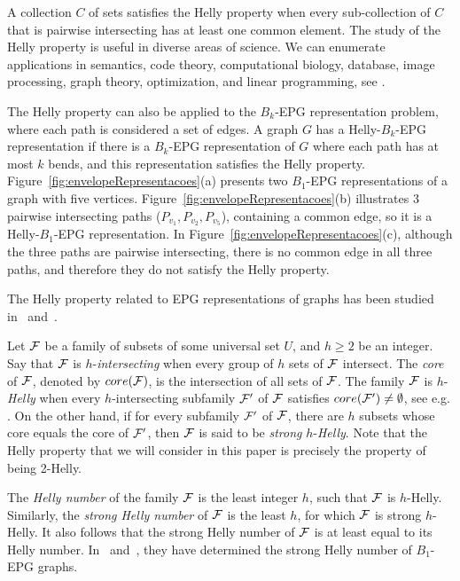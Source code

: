 A  collection $C$ of sets satisfies the Helly property when every sub-collection of $C$ that is pairwise intersecting has at least one common element. 
The study of the Helly property is useful in diverse areas of science. We can enumerate applications in semantics, code theory, computational biology, database, image processing, graph theory, optimization, and linear programming, see \cite{dourado2009}.

The Helly property can also be applied to the $B_k$-EPG representation problem, where each path is considered a set of edges. A graph $G$ has a  Helly-$B_k$-EPG representation if there is a $B_k$-EPG representation of $G$ where each path has at most $k$ bends, and this representation satisfies the Helly property. Figure~\ref{fig:envelopeRepresentacoes}(a) presents two $B_1$-EPG representations of a graph with five vertices.  Figure~\ref{fig:envelopeRepresentacoes}(b)   illustrates 3 pairwise intersecting paths ($P_{v_1}, P_{v_2}, P_{v_5}$), containing a common edge, so it is a Helly-$B_1$-EPG representation. In Figure~\ref{fig:envelopeRepresentacoes}(c), although the three paths are pairwise intersecting, there is no common edge in all three paths, and therefore they do not satisfy the Helly property.

The Helly property related to EPG representations of graphs has been studied in~\cite{golumbic2009} and~\cite{golumbic2013}. 

Let $\cal {F}$ be a family of subsets of some universal set $U$, and $h\geq 2$ be an integer.  Say that $\cal{F}$ is $h$-{\it intersecting} when every group of $h$ sets of $\cal {F}$ intersect. The {\it core} of $\cal {F}$, denoted by $core(\cal F)$, is the intersection of all sets of $\cal {F}$. The family $\cal{F}$ is $h$-{\it Helly} when every $h$-intersecting subfamily $\cal{F'}$ of $\cal{F}$ satisfies $core(\cal{F'}) \neq \emptyset$, see e.g. \cite{duchet1978propriete}. On the other hand, if for every subfamily $\cal{F'}$ of $\cal{F}$, there are $h$ subsets whose core equals the core of  $\cal {F'}$, then $\cal {F}$ is said to be {\it strong} $h$-{\it Helly}.
Note that the Helly property that we will consider in this paper is precisely the property of being 2-Helly. 

The  {\it Helly number} of the family $\cal{F}$ is the least integer $h$, such that $\cal{F}$ is $h$-Helly. Similarly, the {\it strong Helly number} of $\cal{F}$ is the least $h$, for which  $\cal{F}$ is strong $h$-Helly. It also follows that the strong Helly number of $\cal{F}$ is at least equal to its Helly number. In~\cite{golumbic2009} and~\cite{golumbic2013}, they have determined the strong Helly number of $B_1$-EPG graphs. 

